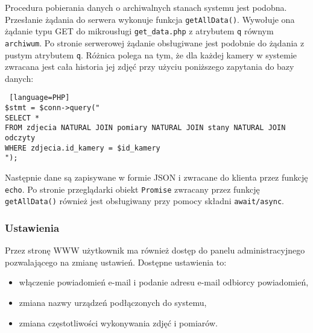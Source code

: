 \documentclass[a4paper,11pt,twoside]{article}
\begin{document}
Procedura pobierania danych o archiwalnych stanach systemu jest podobna. Przesłanie żądania do serwera wykonuje funkcja \texttt{getAllData()}. Wywołuje ona żądanie typu GET do mikrousługi \texttt{get{\_}data.php} z atrybutem \texttt{q} równym \texttt{archiwum}. Po stronie serwerowej żądanie obsługiwane jest podobnie do żądania z pustym atrybutem \texttt{q}. Różnica polega na tym, że dla każdej kamery w systemie zwracana jest cała historia jej zdjęć przy użyciu poniższego zapytania do bazy danych:
\begin{lstlisting} [language=PHP]
$stmt = $conn->query("
SELECT *
FROM zdjecia NATURAL JOIN pomiary NATURAL JOIN stany NATURAL JOIN odczyty
WHERE zdjecia.id_kamery = $id_kamery
");
\end{lstlisting}
Następnie dane są zapisywane w formie JSON i zwracane do klienta przez funkcję \texttt{echo}. Po stronie przeglądarki obiekt \texttt{Promise} zwracany przez funkcję \texttt{getAllData()} również jest obsługiwany przy pomocy składni \texttt{await/async}. 

\subsubsection{Ustawienia}
Przez stronę WWW użytkownik ma również dostęp do panelu administracyjnego pozwalającego na zmianę ustawień. Dostępne ustawienia to:
\begin{itemize}
\item włączenie powiadomień e-mail i podanie adresu e-mail odbiorcy powiadomień,
\item zmiana nazwy urządzeń podłączonych do systemu,
\item zmiana częstotliwości wykonywania zdjęć i pomiarów.
\end{itemize}
\end{document}
